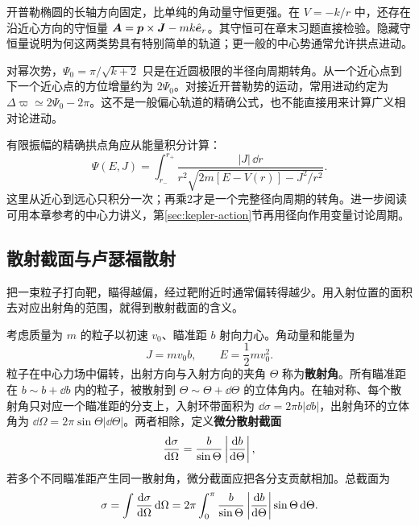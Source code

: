 \begin{physicsbox}
开普勒椭圆的长轴方向固定，比单纯的角动量守恒更强。在 $V=-k/r$ 中，还存在沿近心方向的守恒量 $\boldsymbol{A}=\boldsymbol{p}\times\boldsymbol{J}-mk\hat{\boldsymbol{e}}_r$。其守恒可在章末习题直接检验。隐藏守恒量说明为何这两类势具有特别简单的轨道；更一般的中心势通常允许拱点进动。
\end{physicsbox}
\begin{modernbox}[title={近圆拱点进动的适用范围}]
对幂次势，$\Psi_0=\pi/\sqrt{k+2}$ 只是在近圆极限的半径向周期转角。从一个近心点到下一个近心点的方位增量约为 $2\Psi_0$。对接近开普勒势的运动，常用进动约定为 $\Delta\varpi\simeq2\Psi_0-2\pi$。这不是一般偏心轨道的精确公式，也不能直接用来计算广义相对论进动。

有限振幅的精确拱点角应从能量积分计算：
\begin{equation}\label{eq:apsidal-integral}
\Psi(E,J)=\int_{r_-}^{r_+}
\frac{|J|\,\dd r}{r^2\sqrt{2m[E-V(r)]-J^2/r^2}}.
\end{equation}
这里从近心到远心只积分一次；再乘2才是一个完整径向周期的转角。进一步阅读可用本章参考的中心力讲义，第\ref{sec:kepler-action}节再用径向作用变量讨论周期。
\end{modernbox}

\subsection{散射截面与卢瑟福散射}

把一束粒子打向靶，瞄得越偏，经过靶附近时通常偏转得越少。用入射位置的面积去对应出射角的范围，就得到散射截面的含义。

考虑质量为 $m$ 的粒子以初速 $v_0$、瞄准距 $b$ 射向力心。角动量和能量为
\begin{equation}
J=mv_0b,\qquad E=\frac12mv_0^2 .
\end{equation}
粒子在中心力场中偏转，出射方向与入射方向的夹角 $\Theta$ 称为\textbf{散射角}。所有瞄准距在 $b\sim b+\dd b$ 内的粒子，被散射到 $\Theta\sim\Theta+\dd\Theta$ 的立体角内。在轴对称、每个散射角只对应一个瞄准距的分支上，入射环带面积为 $\dd\sigma=2\pi b|\dd b|$，出射角环的立体角为 $\dd\Omega=2\pi\sin\Theta|\dd\Theta|$。两者相除，定义\textbf{微分散射截面}
\begin{equation}
\frac{\mathrm{d} \sigma}{\mathrm{d} \Omega}=\frac{b}{\sin\Theta}\left|\frac{\mathrm{d} b}{\mathrm{d} \Theta}\right|,
\label{eq:cross-section}
\end{equation}
若多个不同瞄准距产生同一散射角，微分截面应把各分支贡献相加。总截面为
\begin{equation}
\sigma=\int \frac{\mathrm{d} \sigma}{\mathrm{d} \Omega}\,\mathrm{d}\Omega
=2\pi\int_0^\pi \frac{b}{\sin\Theta}\left|\frac{\mathrm{d} b}{\mathrm{d} \Theta}\right|\sin\Theta\,\mathrm{d}\Theta .
\end{equation}

